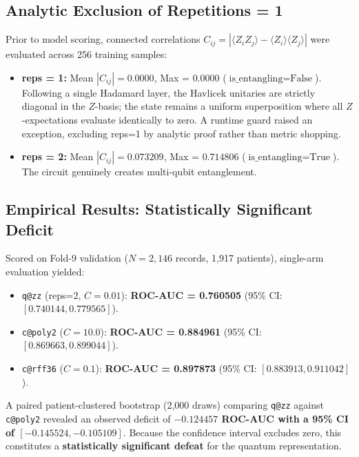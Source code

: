 \documentclass[11pt,a4paper]{report}
\begin{document}
\subsection{Analytic Exclusion of Repetitions = 1}
Prior to model scoring, connected correlations $C_{ij} = |\langle Z_i Z_j \rangle - \langle Z_i \rangle \langle Z_j \rangle|$ were evaluated across 256 training samples:
\begin{itemize}
  \item \textbf{reps = 1:} Mean $|C_{ij}| = \mathbf{0.0000}$, Max = $\mathbf{0.0000}$ ($\text{is\_entangling} = \text{False}$). Following a single Hadamard layer, the Havlicek unitaries are strictly diagonal in the $Z$-basis; the state remains a uniform superposition where all $Z$-expectations evaluate identically to zero. A runtime guard raised an exception, excluding reps=1 by analytic proof rather than metric shopping.
  \item \textbf{reps = 2:} Mean $|C_{ij}| = \mathbf{0.073209}$, Max = $\mathbf{0.714806}$ ($\text{is\_entangling} = \text{True}$). The circuit genuinely creates multi-qubit entanglement.
\end{itemize}

\subsection{Empirical Results: Statistically Significant Deficit}
Scored on Fold-9 validation ($N=2,146$ records, 1,917 patients), single-arm evaluation yielded:
\begin{itemize}
  \item \texttt{q@zz} (reps=2, $C=0.01$): \textbf{ROC-AUC = 0.760505} (95\% CI: $[0.740144, 0.779565]$).
  \item \texttt{c@poly2} ($C=10.0$): \textbf{ROC-AUC = 0.884961} (95\% CI: $[0.869663, 0.899044]$).
  \item \texttt{c@rff36} ($C=0.1$): \textbf{ROC-AUC = 0.897873} (95\% CI: $[0.883913, 0.911042]$).
\end{itemize}
A paired patient-clustered bootstrap (2,000 draws) comparing \texttt{q@zz} against \texttt{c@poly2} revealed an observed deficit of \textbf{$-0.124457$ ROC-AUC with a 95\% CI of $[-0.145524, -0.105109]$}. Because the confidence interval excludes zero, this constitutes a \textbf{statistically significant defeat} for the quantum representation.
\end{document}
